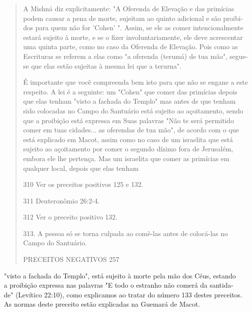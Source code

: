 \begin{quote}
A Mishná diz explicitamente: "A Oferenda de Elevação e das primí­cias
podem causar a pena de morte, sujeitam ao quinto adicional e são
proibi­dos para quem não for 'Cohen' ". Assim, se ele as comer
intencionalmente es­tará sujeito à morte, e se o fizer
involuntariamente, ele deve acrescentar uma quinta parte, como no caso
da Oferenda de Elevação. Pois como as Escrituras se referem a elas como
"a oferenda (terumá) de tua mão", segue-se que elas estão sujeitas à
mesma lei que a terurna".

É importante que você compreenda bem isto para que não se enga­ne a este
respeito. A lei é a seguinte: um "Cohen" que comer das primícias de­pois
que elas tenham "visto a fachada do Templo" mas antes de que tenham sido
colocadas no Campo do Santuário está sujeito ao açoitamento, sendo que a
proibição está expressa em Suas palavras "Não te será permitido comer em
tuas cidades... as oferendas de tua mão", de acordo com o que está
explicado em Macot, assim como no caso de um israelita que está sujeito
ao açoitamento por comer o segundo dízimo fora de Jerusalém, embora ele
lhe pertença. Mas um israelita que comer as primícias em qualquer local,
depois que elas tenham

310 Ver os preceitos positivos 125 e 132.

311 Deuteronômio 26:2-4.

312 Ver o preceito positivo 132.

313. A pessoa só se torna culpada ao comè-las antes de colocá-las no
Campo do Santuário.

PRECEITOS NEGATIVOS 257
\end{quote}

"visto a fachada do Templo", está sujeito à morte pela mão dos Céus,
estando\\
a proibição expressa nas palavras "E todo o estranho não comerá da
santida-\\
de" (Levítico 22:10), como explicamos ao tratar do número 133 destes
preceitos.\\
As normas deste preceito estão explicadas na Guemará de Macot.

